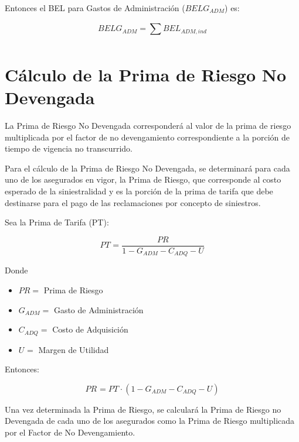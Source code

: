 \documentclass[11pt,twoside,openright,spanish]{report}
\numberwithin{equation}{chapter}
\numberwithin{figure}{chapter}
\numberwithin{table}{chapter}
\begin{document}
	Entonces el BEL para Gastos de Administración ($BELG_{ADM}$) es:
	

\begin{equation}
	BELG_{ADM}=\sum _{}^{}BEL_{ADM,ind}^{}
	\label{eq11}
	\end{equation}


 
	
	\section{Cálculo de la Prima de Riesgo No Devengada}
	 
	
	La Prima de Riesgo No Devengada corresponderá al valor de la prima de riesgo multiplicada por el factor de no devengamiento correspondiente a la porción de tiempo de vigencia no transcurrido.
	
	 
	
	Para el cálculo de la Prima de Riesgo No Devengada, se determinará para cada uno de los asegurados en vigor, la Prima de Riesgo, que corresponde al costo esperado de la siniestralidad y es la porción de la prima de tarifa que debe destinarse para el pago de las reclamaciones por concepto de siniestros.
	
	 
	
	Sea la Prima de Tarifa (PT):
	
	 
\begin{equation}
		{PT}_{}^{}=\frac{{PR}_{}^{}}{{1}_{}-{}G_{ADM}-{C}_{ADQ}-{U}_{}}
		\label{eq12}
\end{equation}
 
	
	Donde
	
	 
		\begin{itemize}
		\setlength\itemsep{-0.5em}
	\item $PR=$ Prima de Riesgo
	
	\item $G_{ADM}^{}=$ Gasto de Administración
	
	\item $C_{ADQ}^{}=$ Costo de Adquisición
	
	\item $U_{}^{}=$ Margen de Utilidad
	\end{itemize}
	 
 
	
	Entonces:
	
\begin{equation}
		{PR}_{}^{}={{PT}_{}\cdot(1-G_{ADM}-C_{ADQ}-U)}
		\label{eq13}
		\end{equation}


	Una vez determinada la Prima de Riesgo, se calculará la Prima de Riesgo no Devengada de cada uno de los asegurados como la Prima de Riesgo multiplicada por el Factor de No Devengamiento.
		
\end{document}
